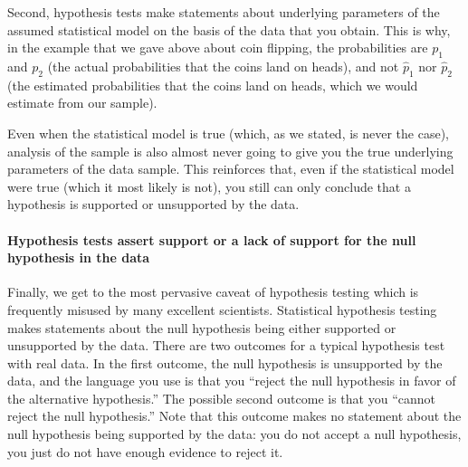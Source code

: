 Second, hypothesis tests make statements about underlying parameters of the assumed statistical model on the basis of the data that you obtain. This is why, in the example that we gave above about coin flipping, the probabilities are $p_1$ and $p_2$ (the actual probabilities that the coins land on heads), and not $\hat p_1$ nor $\hat p_2$ (the estimated probabilities that the coins land on heads, which we would estimate from our sample).

Even when the statistical model is true (which, as we stated, is never the case), analysis of the sample is also almost never going to give you the true underlying parameters of the data sample. This reinforces that, even if the statistical model were true (which it most likely is not), you still can only conclude that a hypothesis is supported or unsupported by the data.

\paragraph*{Hypothesis tests assert support or a lack of support for the null hypothesis in the data}

Finally, we get to the most pervasive caveat of hypothesis testing which is frequently misused by many excellent scientists. Statistical hypothesis testing makes statements about the null hypothesis being either supported or unsupported by the data. There are two outcomes for a typical hypothesis test with real data. In the first outcome, the null hypothesis is unsupported by the data, and the language you use is that you ``reject the null hypothesis in favor of the alternative hypothesis.'' The possible second outcome is that you ``cannot reject the null hypothesis.'' Note that this outcome makes no statement about the null hypothesis being supported by the data: you do not accept a null hypothesis, you just do not have enough evidence to reject it.


\newpage